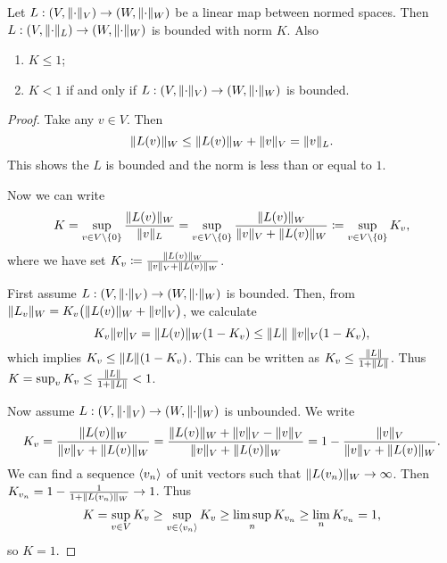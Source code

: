 \begin{proposition}
Let $L: \sSet{V, \norm{\cdot}_V}\to \sSet{W, \norm{\cdot}_W}$ be a linear map between normed spaces. Then $L: \sSet{V, \norm{\cdot}_L}\to \sSet{W, \norm{\cdot}_W}$ is bounded with norm $K$.
Also
\begin{enumerate}
\item $K \leq 1$;
\item $K < 1$ \textup{if and only if} $L: \sSet{V, \norm{\cdot}_V}\to \sSet{W, \norm{\cdot}_W}$ is bounded.
\end{enumerate}
\end{proposition}
\begin{proof}
Take any $v\in V$. Then
\[ \lVert L(v)\rVert_W \leq \lVert L(v)\rVert_W + \lVert v\rVert_V = \lVert v\rVert_L. \]
This shows the $L$ is bounded and the norm is less than or equal to $1$.

Now we can write
\[ K = \sup_{v\in V\setminus\{0\}}\frac{\lVert L(v)\rVert_W}{\lVert v\rVert_L} = \sup_{v\in V\setminus\{0\}}\frac{\lVert L(v)\rVert_W}{\lVert v\rVert_V + \lVert L(v)\rVert_W} \coloneqq \sup_{v\in V\setminus\{0\}}K_v, \]
where we have set $K_v \coloneqq \frac{\lVert L(v)\rVert_W}{\lVert v\rVert_V + \lVert L(v)\rVert_W}$.

First assume $L: \sSet{V, \norm{\cdot}_V}\to \sSet{W, \norm{\cdot}_W}$ is bounded. Then, from $\lVert L_v\rVert_W = K_v \big(\lVert L(v)\rVert_W + \lVert v\rVert_V\big)$, we calculate
\[ K_v\lVert v\rVert_V = \lVert L(v)\rVert_W(1-K_v) \leq \lVert L\rVert\;\lVert v\rVert_V(1-K_v), \]
which implies $K_v \leq \lVert L\rVert(1-K_v)$. This can be written as $K_v \leq \frac{\lVert L\rVert}{1+ \lVert L\rVert}$.
Thus $K = \sup_v K_v \leq \frac{\lVert L\rVert}{1+ \lVert L\rVert} < 1$.

Now assume $L: \sSet{V, \norm{\cdot}_V}\to \sSet{W, \norm{\cdot}_W}$ is unbounded. We write
\[ K_v = \frac{\lVert L(v)\rVert_W}{\lVert v\rVert_V + \lVert L(v)\rVert_W} = \frac{\lVert L(v)\rVert_W + \lVert v\rVert_V - \lVert v\rVert_V}{\lVert v\rVert_V + \lVert L(v)\rVert_W} = 1 - \frac{\lVert v\rVert_V}{\lVert v\rVert_V + \lVert L(v)\rVert_W}. \]
We can find a sequence $\left\langle v_n \right\rangle$ of unit vectors such that $\lVert L(v_n)\rVert_W \to \infty$. Then $K_{v_n} = 1 - \frac{1}{1+\lVert L(v_n)\rVert_W} \to 1$. Thus
\[ K = \sup_{v\in V}K_v \geq \sup_{v\in \left\langle v_n \right\rangle}K_v \geq \limsup_{n}K_{v_n} \geq \lim_{n}K_{v_n} = 1, \]
so $K = 1$.
\end{proof}


